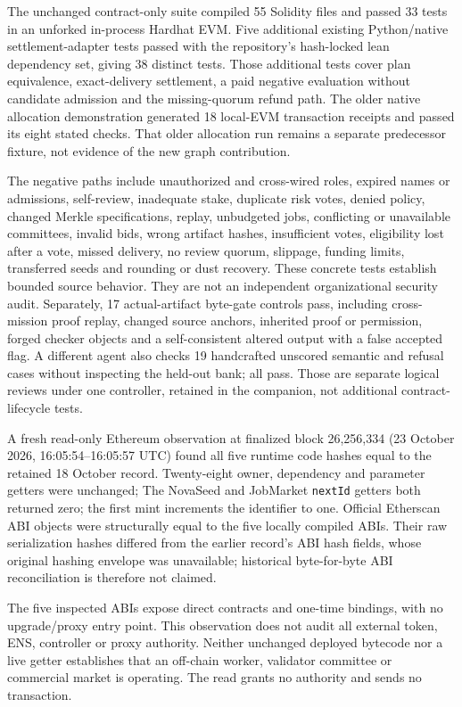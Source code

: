 \documentclass[11pt]{article}
\begin{document}
The unchanged contract-only suite compiled 55 Solidity files and passed 33 tests in an unforked in-process Hardhat EVM. Five additional existing Python/native settlement-adapter tests passed with the repository's hash-locked lean dependency set, giving 38 distinct tests. Those additional tests cover plan equivalence, exact-delivery settlement, a paid negative evaluation without candidate admission and the missing-quorum refund path. The older native allocation demonstration generated 18 local-EVM transaction receipts and passed its eight stated checks. That older allocation run remains a separate predecessor fixture, not evidence of the new graph contribution.

The negative paths include unauthorized and cross-wired roles, expired names or admissions, self-review, inadequate stake, duplicate risk votes, denied policy, changed Merkle specifications, replay, unbudgeted jobs, conflicting or unavailable committees, invalid bids, wrong artifact hashes, insufficient votes, eligibility lost after a vote, missed delivery, no review quorum, slippage, funding limits, transferred seeds and rounding or dust recovery. These concrete tests establish bounded source behavior. They are not an independent organizational security audit. Separately, 17 actual-artifact byte-gate controls pass, including cross-mission proof replay, changed source anchors, inherited proof or permission, forged checker objects and a self-consistent altered output with a false accepted flag. A different agent also checks 19 handcrafted unscored semantic and refusal cases without inspecting the held-out bank; all pass. Those are separate logical reviews under one controller, retained in the companion, not additional contract-lifecycle tests.

A fresh read-only Ethereum observation at finalized block 26,256,334 (23 October 2026, 16:05:54--16:05:57 UTC) found all five runtime code hashes equal to the retained 18 October record. Twenty-eight owner, dependency and parameter getters were unchanged; The NovaSeed and JobMarket \texttt{nextId} getters both returned zero; the first mint increments the identifier to one. Official Etherscan ABI objects were structurally equal to the five locally compiled ABIs. Their raw serialization hashes differed from the earlier record's ABI hash fields, whose original hashing envelope was unavailable; historical byte-for-byte ABI reconciliation is therefore not claimed.

The five inspected ABIs expose direct contracts and one-time bindings, with no upgrade/proxy entry point. This observation does not audit all external token, ENS, controller or proxy authority. Neither unchanged deployed bytecode nor a live getter establishes that an off-chain worker, validator committee or commercial market is operating. The read grants no authority and sends no transaction.
\end{document}

